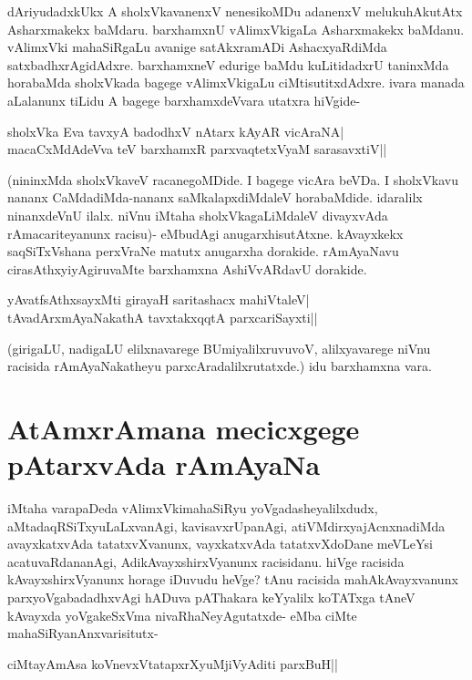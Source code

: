 dAriyudadxkUkx A sholxVkavanenxV nenesikoMDu adanenxV melukuhAkutAtx Asharxmakekx baMdaru. barxhamxnU vAlimxVkigaLa Asharxmakekx baMdanu. vAlimxVki mahaSiRgaLu avanige satAkxramADi AshacxyaRdiMda satxbadhxrAgidAdxre. barxhamxneV edurige baMdu kuLitidadxrU taninxMda horabaMda sholxVkada bagege vAlimxVkigaLu ciMtisutitxdAdxre. ivara manada aLalanunx tiLidu A bagege barxhamxdeVvara utatxra hiVgide- 

\begin{shloka} 
sholxVka Eva tavxyA badodhxV nAtarx kAyAR vicAraNA|\label{157c}\\ 
macaCxMdAdeVva teV barxhamxR parxvaqtetxVyaM sarasavxtiV||
\end{shloka} 

(nininxMda sholxVkaveV racanegoMDide. I bagege vicAra beVDa. I sholxVkavu nananx CaMdadiMda-nananx saMkalapxdiMdaleV horabaMdide. idaralilx ninanxdeVnU ilalx. niVnu iMtaha sholxVkagaLiMdaleV divayxvAda rAmacariteyanunx racisu)- eMbudAgi anugarxhisutAtxne. kAvayxkekx saqSiTxVshana perxVraNe matutx anugarxha dorakide. rAmAyaNavu cirasAthxyiyAgiruvaMte barxhamxna AshiVvARdavU dorakide. 

\begin{shloka} 
yAvatfsAthxsayxMti girayaH saritashacx mahiVtaleV|\label{158b}\\ 
tAvadArxmAyaNakathA tavxtakxqqtA parxcariSayxti||
\end{shloka} 

(girigaLU, nadigaLU elilxnavarege BUmiyalilxruvuvoV, alilxyavarege niVnu racisida rAmAyaNakatheyu parxcAradalilxrutatxde.) idu barxhamxna vara. 

\section*{AtAmxrAmana mecicxgege pAtarxvAda rAmAyaNa} 

iMtaha varapaDeda vAlimxVkimahaSiRyu yoVgadasheyalilxdudx, aMtadaqRSiTxyuLaLxvanAgi, kavisavxrUpanAgi, atiVMdirxyajAcnxnadiMda avayxkatxvAda tatatxvXvanunx, vayxkatxvAda tatatxvXdoDane meVLeYsi acatuvaRdananAgi, AdikAvayxshirxVyanunx racisidanu. hiVge racisida kAvayxshirxVyanunx horage iDuvudu heVge? tAnu racisida mahAkAvayxvanunx parxyoVgabadadhxvAgi hADuva pAThakara keYyalilx koTATxga tAneV kAvayxda yoVgakeSxVma nivaRhaNeyAgutatxde- eMba ciMte mahaSiRyanAnxvarisitutx- 

\begin{shloka} 
ciMtayAmAsa koVnevxVtatapxrXyuMjiVyAditi parxBuH||\label{158a}
\end{shloka} 

